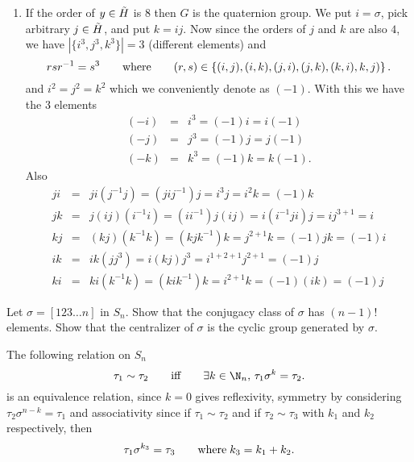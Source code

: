\documentclass[12pt]{book}
\newcounter{myenumi}
\newenvironment{myenumerate}
{\begin{enumerate}
 \setcounter{enumi}{\themyenumi}
}
{\setcounter{myenumi}{\theenumi}
 \end{enumerate}}
\begin{document}
\begin{myenumerate}
\begin{enumerate}
\item If the order of \(y\in\tilde{H}\) is $8$ then $G$ is the quaternion group.
We put \(i=\sigma\), pick arbitrary \(j\in\tilde{H}\), and put \(k=ij\).
Now since the orders of $j$ and $k$ are also $4$,
we have \(|\{i^3,j^3,k^3\}|=3\) (different elements) and
\begin{equation*}
rsr^{-1}=s^3 \qquad \textnormal{where} \qquad
(r,s) \in \left\{(i,j), (i,k), (j,i), (j, k), (k,i), k,j)\right\}.
\end{equation*}
and \(i^2 = j^2 = k^2\) which we conveniently denote as \((-1)\).
With this we have the 3 elements
\begin{eqnarray*}
(-i) &=& i^{3} = (-1)i = i(-1) \\
(-j) &=& j^{3} = (-1)j = j(-1) \\
(-k) &=& k^{3} = (-1)k = k(-1).
\end{eqnarray*}
Also
\begin{eqnarray*}
ji &=& ji(j^{-1}j) = (jij^{-1})j = i^{3}j = i^2k = (-1)k \\
jk &=& j(ij)(i^{-1}i) = (ii^{-1})j(ij) = i(i^{-1}ji)j = ij^{3+1} = i \\
kj &=& (kj)(k^{-1}k) = (kjk^{-1})k = j^{2+1}k = (-1)jk = (-1)i   \\
ik &=& ik(jj^3) = i(kj)j^3 = i^{1+2+1}j^{2+1} = (-1)j \\
ki &=& ki(k^{-1}k) = (kik^{-1})k = i^{2+1}k = (-1)(ik) = (-1)j
\end{eqnarray*}
\end{enumerate}


\begin{excopy}
Let \(\sigma = [123 \ldots n]\) in \(S_n\).
Show that the conjugacy class of \(\sigma\) has \((n - 1)!\) elements.
Show that the centralizer of \(\sigma\) is the cyclic group generated by
\(\sigma\).
\end{excopy}

The following relation on \(S_n\)
\begin{equation*}
\tau_1 \sim \tau_2
\qquad \textnormal{iff} \qquad
\exists k\in \N_n,\, \tau_1 \sigma^k = \tau_2.
\end{equation*}
is an equivalence relation, since
\(k=0\) gives reflexivity, symmetry by considering
\(\tau_2 \sigma^{n-k} = \tau_1\) and associativity
since if \(\tau_1 \sim \tau_2\)
and if \(\tau_2 \sim \tau_3\)
with \(k_1\) and \(k_2\) respectively, then
\begin{equation*}
\tau_1 \sigma^{k_3} = \tau_3
\qquad \textnormal{where}\; k_3 = k_1+k_2.
\end{equation*}


\end{myenumerate}
\end{document}

